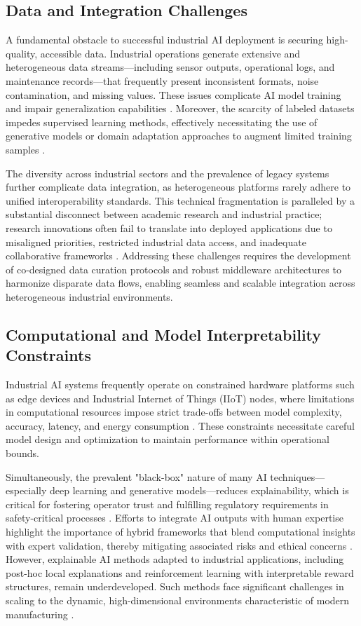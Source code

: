 \documentclass[11pt]{article}
\begin{document}
\subsection{Data and Integration Challenges}

A fundamental obstacle to successful industrial AI deployment is securing high-quality, accessible data. Industrial operations generate extensive and heterogeneous data streams—including sensor outputs, operational logs, and maintenance records—that frequently present inconsistent formats, noise contamination, and missing values. These issues complicate AI model training and impair generalization capabilities \cite{ref6,ref9}. Moreover, the scarcity of labeled datasets impedes supervised learning methods, effectively necessitating the use of generative models or domain adaptation approaches to augment limited training samples \cite{ref2,ref3}.

The diversity across industrial sectors and the prevalence of legacy systems further complicate data integration, as heterogeneous platforms rarely adhere to unified interoperability standards. This technical fragmentation is paralleled by a substantial disconnect between academic research and industrial practice; research innovations often fail to translate into deployed applications due to misaligned priorities, restricted industrial data access, and inadequate collaborative frameworks \cite{ref3}. Addressing these challenges requires the development of co-designed data curation protocols and robust middleware architectures to harmonize disparate data flows, enabling seamless and scalable integration across heterogeneous industrial environments.

\subsection{Computational and Model Interpretability Constraints}

Industrial AI systems frequently operate on constrained hardware platforms such as edge devices and Industrial Internet of Things (IIoT) nodes, where limitations in computational resources impose strict trade-offs between model complexity, accuracy, latency, and energy consumption \cite{ref2,ref31}. These constraints necessitate careful model design and optimization to maintain performance within operational bounds.

Simultaneously, the prevalent "black-box" nature of many AI techniques—especially deep learning and generative models—reduces explainability, which is critical for fostering operator trust and fulfilling regulatory requirements in safety-critical processes \cite{ref2,ref34}. Efforts to integrate AI outputs with human expertise highlight the importance of hybrid frameworks that blend computational insights with expert validation, thereby mitigating associated risks and ethical concerns \cite{ref2}. However, explainable AI methods adapted to industrial applications, including post-hoc local explanations and reinforcement learning with interpretable reward structures, remain underdeveloped. Such methods face significant challenges in scaling to the dynamic, high-dimensional environments characteristic of modern manufacturing \cite{ref14,ref36}.
\end{document}
